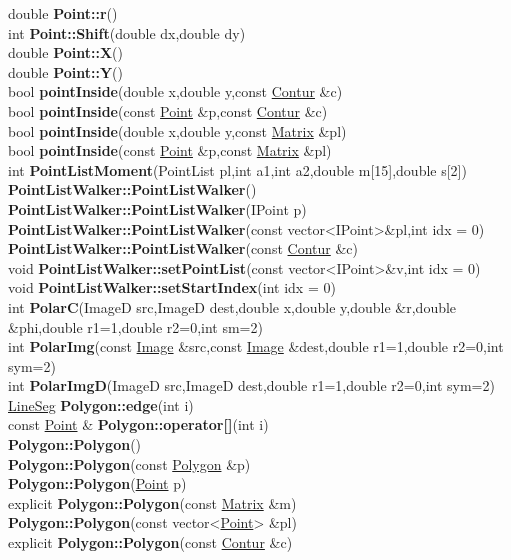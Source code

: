 \documentclass[10pt,titlepage]{article}
\def\functionlistentry#1#2#3#4#5#6{\noindent #1 {\bf #2}(#3) \dotfill #6\\}
\begin{document}
{{\functionlistentry{double}{Point::r}{}{171}{datastructures}{}
\functionlistentry{int}{Point::Shift}{double dx,double dy}{170}{datastructures}{}
\functionlistentry{double}{Point::X}{}{157}{datastructures}{}
\functionlistentry{double}{Point::Y}{}{158}{datastructures}{}
\functionlistentry{bool}{pointInside}{double x,double y,const \hyperlink{Contur}{Contur} \&c}{459}{conturs}{}
\functionlistentry{bool}{pointInside}{const \hyperlink{Point}{Point} \&p,const \hyperlink{Contur}{Contur} \&c}{460}{conturs}{}
\functionlistentry{bool}{pointInside}{double x,double y,const \hyperlink{Matrix}{Matrix} \&pl}{461}{conturs}{}
\functionlistentry{bool}{pointInside}{const \hyperlink{Point}{Point} \&p,const \hyperlink{Matrix}{Matrix} \&pl}{462}{conturs}{}
\functionlistentry{int}{PointListMoment}{PointList pl,int a1,int a2,double m[15],double s[2]}{1605}{obsolet}{}
\functionlistentry{}{PointListWalker::PointListWalker}{}{185}{datastructures}{}
\functionlistentry{}{PointListWalker::PointListWalker}{IPoint p}{186}{datastructures}{}
\functionlistentry{}{PointListWalker::PointListWalker}{const vector\textless {}IPoint\textgreater  \&pl,int idx = 0}{187}{datastructures}{}
\functionlistentry{}{PointListWalker::PointListWalker}{const \hyperlink{Contur}{Contur} \&c}{188}{datastructures}{}
\functionlistentry{void}{PointListWalker::setPointList}{const vector\textless {}IPoint\textgreater  \&v,int idx = 0}{189}{datastructures}{}
\functionlistentry{void}{PointListWalker::setStartIndex}{int idx = 0}{190}{datastructures}{}
\functionlistentry{int}{PolarC}{ImageD src,ImageD dest,double x,double y,double \&r,double \&phi,double r1=1,double r2=0,int sm=2}{1103}{processing}{}
\functionlistentry{int}{PolarImg}{const \hyperlink{Image}{Image} \&src,const \hyperlink{Image}{Image} \&dest,double r1=1,double r2=0,int sym=2}{1102}{processing}{}
\functionlistentry{int}{PolarImgD}{ImageD src,ImageD dest,double r1=1,double r2=0,int sym=2}{1101}{processing}{}
\functionlistentry{\hyperlink{LineSeg}{LineSeg}}{Polygon::edge}{int i}{619}{geoObject}{}
\functionlistentry{const \hyperlink{Point}{Point} \&}{Polygon::operator[]}{int i}{618}{geoObject}{}
\functionlistentry{}{Polygon::Polygon}{}{611}{geoObject}{}
\functionlistentry{}{Polygon::Polygon}{const \hyperlink{Polygon}{Polygon} \&p}{612}{geoObject}{}
\functionlistentry{}{Polygon::Polygon}{\hyperlink{Point}{Point} p}{613}{geoObject}{}
\functionlistentry{explicit}{Polygon::Polygon}{const \hyperlink{Matrix}{Matrix} \&m}{614}{geoObject}{}
\functionlistentry{}{Polygon::Polygon}{const vector<\hyperlink{Point}{Point}> \&pl}{615}{geoObject}{}
\functionlistentry{explicit}{Polygon::Polygon}{const \hyperlink{Contur}{Contur} \&c}{616}{geoObject}{}
}}
\end{document}
